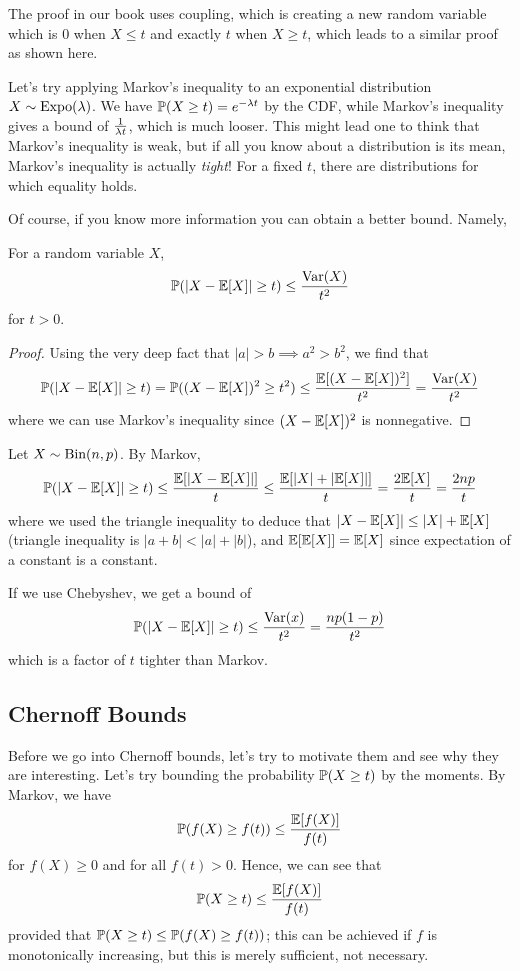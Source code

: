 \documentclass[11 pt]{scrartcl}
\begin{document}
The proof in our book uses coupling, which is creating a new random variable which is $0$ when $X\leq t$ and exactly $t$ when $X\geq t$, which leads to a similar proof as shown here. 

Let's try applying Markov's inequality to an exponential distribution $X\sim \text{Expo}(\lambda)$. We have $\mathbb P(X\geq t) = e^{-\lambda t}$ by the CDF, while Markov's inequality gives a bound of $\frac{1}{\lambda t}$, which is much looser. This might lead one to think that Markov's inequality is weak, but if all you know about a distribution is its mean, Markov's inequality is actually \emph{tight}! For a fixed $t$, there are distributions for which equality holds.

Of course, if you know more information you can obtain a better bound. Namely, 

\begin{theorem}[Chebyshev]
    For a random variable $X$, 
    \[ \mathbb P(|X-\mathbb E[X]| \geq t) \leq \dfrac{\text{Var}(X)}{t^2}\] 
    for $t>0$.
    \label{thm:chebyshev}
\end{theorem}
\begin{proof}
    Using the very deep fact that $|a| > b \implies a^2 > b^2$, we find that 
    \[ \mathbb P(|X-\mathbb E[X]|\geq t) = \mathbb P((X-\mathbb E[X])^2 \geq t^2) \leq \dfrac{\mathbb E[(X-\mathbb E[X])^2]}{t^2} = \dfrac{\text{Var}(X)}{t^2}\]
    where we can use Markov's inequality since $(X-\mathbb E[X])^2$ is nonnegative. 
\end{proof}

\begin{example}
    Let $X\sim \text{Bin}(n,p)$. By Markov, 
    \[ \mathbb P(|X-\mathbb E[X]|\geq t) \leq \dfrac{\mathbb E[|X -\mathbb E[X]|]}{t} \leq \dfrac{\mathbb E[|X|+|\mathbb E[X]|]}{t} = \dfrac{2\mathbb E[X]}{t} = \dfrac{2np}{t}\] 
    where we used the triangle inequality to deduce that $|X-\mathbb E[X]| \leq |X| + \mathbb E[X]$ (triangle inequality is $|a+b| < |a| + |b|$), and $\mathbb E[\mathbb E[X]] = \mathbb E[X]$ since expectation of a constant is a constant. 
    
    If we use Chebyshev, we get a bound of 
    \[ \mathbb P(|X-\mathbb E[X]|\geq t) \leq \dfrac{\text{Var}(x)}{t^2} = \dfrac{np(1-p)}{t^2}\] 
    which is a factor of $t$ tighter than Markov. 
\end{example}

\subsection{Chernoff Bounds}

Before we go into Chernoff bounds, let's try to motivate them and see why they are interesting. Let's try bounding the probability $\mathbb P(X\geq t)$ by the moments. By Markov, we have 
\[ \mathbb P(f(X) \geq f(t)) \leq \dfrac{\mathbb E[f(X)]}{f(t)}\] 
for $f(X) \geq 0$ and for all $f(t) > 0$. Hence, we can see that 
\[ \mathbb P(X \geq t) \leq \dfrac{\mathbb E[f(X)]}{f(t)}\] 
provided that $\mathbb P(X\geq t) \leq \mathbb P(f(X) \geq f(t))$; this can be achieved if $f$ is monotonically increasing, but this is merely sufficient, not necessary. 
\end{document}
